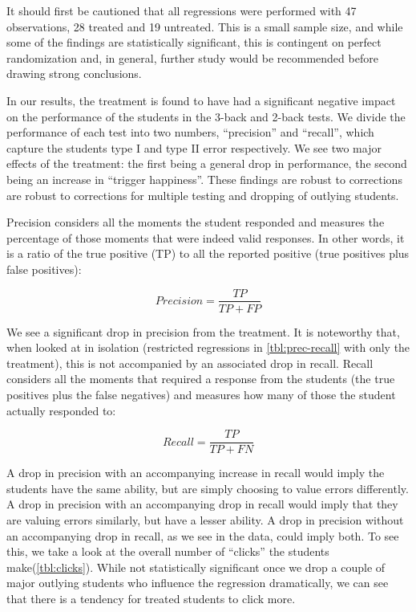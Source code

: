 \documentclass[a4paper,12pt]{article}
\begin{document}
It should first be cautioned that all regressions were performed with 47 observations, 28 treated and 19 untreated. This is a small sample size, and while some of the findings are statistically significant, this is contingent on perfect randomization and, in general, further study would be recommended before drawing strong conclusions. 

In our results, the treatment is found to have had a significant negative impact on the performance of the students in the 3-back and 2-back tests. We divide the performance of each test into two numbers, ``precision'' and ``recall'', which capture the students type I and type II error respectively. We see two major effects of the treatment: the first being a general drop in performance, the second being an increase in ``trigger happiness''. These findings are robust to corrections are robust to corrections for multiple testing and dropping of outlying students.

Precision considers all the moments the student responded and measures the percentage of those moments that were indeed valid responses. In other words, it is a ratio of the true positive (TP) to all the reported positive (true positives plus false positives):

$$
Precision = \frac{TP}{TP + FP}
$$

We see a significant drop in precision from the treatment. It is noteworthy that, when looked at in isolation (restricted regressions in \ref{tbl:prec-recall} with only the treatment), this is not accompanied by an associated drop in recall. Recall considers all the moments that required a response from the students (the true positives plus the false negatives) and measures how many of those the student actually responded to: 

$$
Recall = \frac{TP}{TP + FN}
$$

A drop in precision with an accompanying increase in recall would imply the students have the same ability, but are simply choosing to value errors differently. A drop in precision with an accompanying drop in recall would imply that they are valuing errors similarly, but have a lesser ability. A drop in precision without an accompanying drop in recall, as we see in the data, could imply both. To see this, we take a look at the overall number of ``clicks'' the students make(\ref{tbl:clicks}). While not statistically significant once we drop a couple of major outlying students who influence the regression dramatically, we can see that there is a tendency for treated students to click more.
\end{document}
